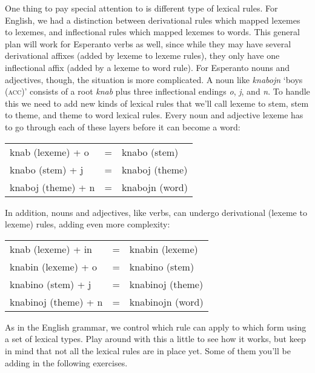 \documentclass[11pt]{article}
\begin{document}
One thing to pay special attention to is different type of lexical rules.
For English, we had a distinction between derivational rules which mapped
lexemes to lexemes, and inflectional rules which mapped lexemes to words.
This general plan will work for Esperanto verbs as well, since while they may
have several derivational affixes (added by lexeme to lexeme rules), they only
have one inflectional affix (added by a lexeme to word rule).  For Esperanto
nouns and adjectives, though, the situation is more complicated.  A noun like
\emph{knabojn} `boys (\textsc{acc})' consists of a root \emph{knab} plus three 
inflectional endings \emph{o}, \emph{j}, and \emph{n}.  To handle this we need 
to add new kinds of lexical rules that we'll call lexeme to stem, stem to
theme, and theme to word lexical rules.  Every noun and adjective lexeme has
to go through each of these layers before it can become a word:
\begin{center}
\begin{tabular}{lcl}
knab (lexeme) + o & = & knabo (stem)\\
knabo (stem) + j & = & knaboj (theme)\\
knaboj (theme) + n & = & knabojn (word)
\end{tabular}
\end{center}
In addition, nouns and adjectives, like verbs, can undergo derivational
(lexeme to lexeme) rules, adding even more complexity:
\begin{center}
\begin{tabular}{lcl}
knab (lexeme) + in & = & knabin (lexeme)\\
knabin (lexeme) + o & = & knabino (stem)\\
knabino (stem) + j & = & knabinoj (theme)\\
knabinoj (theme) + n & = & knabinojn (word)
\end{tabular}
\end{center}
As in the English grammar, we control which rule can apply to which form
using a set of lexical types. Play around with this a little to see how it
works, but keep in mind that not all the lexical rules are in place yet.  Some 
of them you'll be adding in the following exercises.
\end{document}
